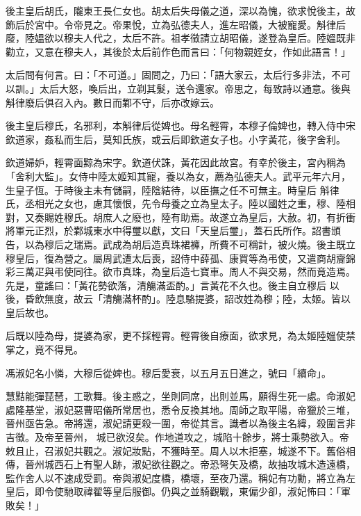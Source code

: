 \begin{pinyinscope}
 後主皇后胡氏，隴東王長仁女也。胡太后失母儀之道，深以為愧，欲求悅後主，故飾后於宮中。令帝見之。帝果悅，立為弘德夫人，進左昭儀，大被寵愛。斛律后廢，陸媼欲以穆夫人代之，太后不許。祖孝徵請立胡昭儀，遂登為皇后。陸媼既非勸立，又意在穆夫人，其後於太后前作色而言曰：「何物親姪女，作如此語言！」



 太后問有何言。曰：「不可道。」固問之，乃曰：「語大家云，太后行多非法，不可
 以訓。」太后大怒，喚后出，立剃其髮，送令還家。帝思之，每致詩以通意。後與斛律廢后俱召入內。數日而鄴不守，后亦改嫁云。



 後主皇后穆氏，名邪利，本斛律后從婢也。母名輕霄，本穆子倫婢也，轉入侍中宋欽道家，姦私而生后，莫知氏族，或云后即欽道女子也。小字黃花，後字舍利。



 欽道婦妒，輕霄面黥為宋字。欽道伏誅，黃花因此故宮。有幸於後主，宮內稱為「舍利大監」。女侍中陸太姬知其寵，養以為女，薦為弘德夫人。武平元年六月，生皇子恆。于時後主未有儲嗣，陸陰結待，以臣撫之任不可無主。時皇后
 斛律氏，丞相光之女也，慮其懷恨，先令母養之立為皇太子。陸以國姓之重，穆、陸相對，又奏賜姓穆氏。胡庶人之廢也，陸有助焉。故遂立為皇后，大赦。初，有折衝將軍元正烈，於鄴城東水中得璽以獻，文曰「天皇后璽」，蓋石氏所作。詔書頒告，以為穆后之瑞焉。武成為胡后造真珠裙褲，所費不可稱計，被火燒。後主既立穆皇后，復為營之。屬周武遭太后喪，詔侍中薛孤、康買等為弔使，又遣商胡齎錦彩三萬疋與弔使同往。欲市真珠，為皇后造七寶車。周人不與交易，然而竟造焉。先是，童謠曰：「黃花勢欲落，清觴滿盃酌。」言黃花不久也。後主自立穆后
 以後，昏飲無度，故云「清觴滿杯酌」。陸息駱提婆，詔改姓為穆；陸，太姬。皆以皇后故也。



 后既以陸為母，提婆為家，更不採輕霄。輕霄後自療面，欲求見，為太姬陸媼使禁掌之，竟不得見。



 馮淑妃名小憐，大穆后從婢也。穆后愛衰，以五月五日進之，號曰「續命」。



 慧黠能彈琵琶，工歌舞。後主惑之，坐則同席，出則並馬，願得生死一處。命淑妃處隆基堂，淑妃惡曹昭儀所常居也，悉令反換其地。周師之取平陽，帝獵於三堆，晉州亟告急。帝將還，淑妃請更殺一圍，帝從其言。識者以為後主名緯，殺圍言非吉徵。及帝至晉州，
 城已欲沒矣。作地道攻之，城陷十餘步，將士乘勢欲入。帝敕且止，召淑妃共觀之。淑妃妝點，不獲時至。周人以木拒塞，城遂不下。舊俗相傳，晉州城西石上有聖人跡，淑妃欲往觀之。帝恐弩矢及橋，故抽攻城木造遠橋，監作舍人以不速成受罰。帝與淑妃度橋，橋壞，至夜乃還。稱妃有功勳，將立為左皇后，即令使馳取禕翟等皇后服御。仍與之並騎觀戰，東偏少卻，淑妃怖曰：「軍敗矣！」




\end{pinyinscope}
